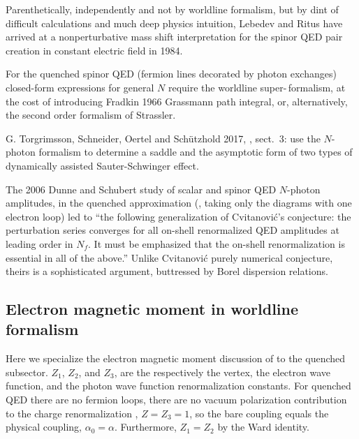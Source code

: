 Parenthetically, independently and not by worldline formalism, but by
dint of difficult calculations and much deep physics intuition, Lebedev
and Ritus have arrived at a nonperturbative mass shift
interpretation for the spinor QED pair creation in constant electric
field in 1984.

For the quenched spinor QED (fermion lines decorated by photon exchanges)
closed-form expressions for general $N$ require the worldline
super-\,formalism, at the cost of introducing Fradkin
1966 Grassmann path integral,
or, alternatively,
the second order
formalism of Strassler.


    G. Torgrimsson, Schneider,  Oertel and Schützhold 2017,
, sect.~3:
use the $N$-photon formalism to determine a saddle and the asymptotic
form of two types of dynamically assisted {Sauter-Schwinger} effect.

The 2006 Dunne and Schubert study of scalar and spinor QED
$N$-photon amplitudes, in the quenched approximation (\ie, taking only
the diagrams with one electron loop) led to ``the following
generalization of Cvitanovi\'c's conjecture: the perturbation series
converges for all on-shell renormalized QED amplitudes at leading order
in $N_f$. It must be emphasized that the on-shell renormalization is
essential in all of the above.''
Unlike Cvitanovi\'c purely numerical conjecture, theirs is a
sophisticated argument, buttressed by Borel dispersion relations.


\subsection{Electron magnetic moment in worldline formalism}
\label{sect:magMomWorldline}

Here we specialize the electron magnetic moment discussion of
 to the quenched subsector.
$Z_1$,
$Z_2$, and %
$Z_3$,
are the respectively the vertex,
the electron wave function, and
the photon wave function
renormalization constants.
For quenched QED there are no
fermion loops, there are no vacuum polarization contribution to the charge
renormalization , $Z=Z_3=1$, so the bare coupling equals
the physical coupling, $\alpha_0= \alpha$.
Furthermore, $Z_1=Z_2$ by the Ward identity.


